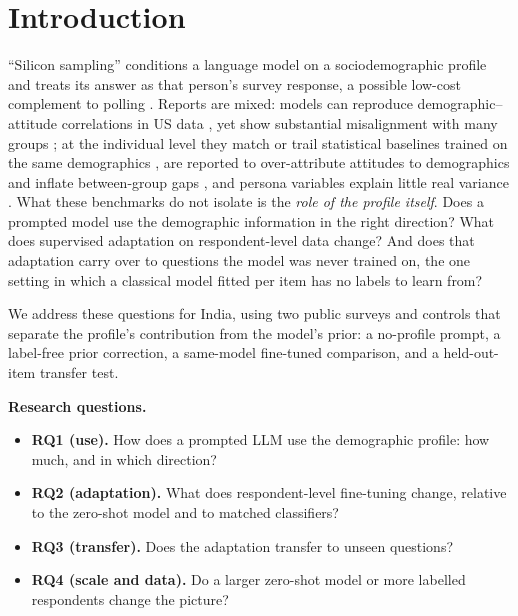\documentclass[conference]{IEEEtran}
\begin{document}
\section{Introduction}

``Silicon sampling'' conditions a language model on a sociodemographic profile and treats its answer as that person's survey response, a possible low-cost complement to polling \cite{argyle2023}. Reports are mixed: models can reproduce demographic--attitude correlations in US data \cite{argyle2023}, yet show substantial misalignment with many groups \cite{santurkar2023}; at the individual level they match or trail statistical baselines trained on the same demographics \cite{chen2026,miranda2025}, are reported to over-attribute attitudes to demographics and inflate between-group gaps \cite{chen2026}, and persona variables explain little real variance \cite{hu2024}. What these benchmarks do not isolate is the \emph{role of the profile itself}. Does a prompted model use the demographic information in the right direction? What does supervised adaptation on respondent-level data change? And does that adaptation carry over to questions the model was never trained on, the one setting in which a classical model fitted per item has no labels to learn from?

We address these questions for India, using two public surveys and controls that separate the profile's contribution from the model's prior: a no-profile prompt, a label-free prior correction, a same-model fine-tuned comparison, and a held-out-item transfer test.

\textbf{Research questions.}
\begin{itemize}
    \item \textbf{RQ1 (use).} How does a prompted LLM use the demographic profile: how much, and in which direction?
    \item \textbf{RQ2 (adaptation).} What does respondent-level fine-tuning change, relative to the zero-shot model and to matched classifiers?
    \item \textbf{RQ3 (transfer).} Does the adaptation transfer to unseen questions?
    \item \textbf{RQ4 (scale and data).} Do a larger zero-shot model or more labelled respondents change the picture?
\end{itemize}
\end{document}
